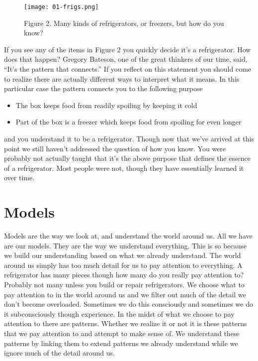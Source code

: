\documentclass[]{memoir}
\let\Oldincludegraphics\includegraphics
\renewcommand{\includegraphics}[1]{\Oldincludegraphics[max size={\textwidth}{\textheight}]{#1}}
\begin{document}
\begin{figure}[htbp]
\centering
\texttt{[image: 01-frigs.png]}
\caption{Figure 2. Many kinds of refrigerators, or freezers, but how do
you know?}
\end{figure}

If you see any of the items in Figure 2 you quickly decide it's a
refrigerator. How does that happen? Gregory Bateson, one of the great
thinkers of our time, said, ``It's the pattern that connects.'' If you
reflect on this statement you should come to realize there are actually
different ways to interpret what it means. In this particular case the
pattern connects you to the following purpose

\begin{itemize}
\itemsep1pt\parskip0pt
\item
  The box keeps food from readily spoiling by keeping it cold
\item
  Part of the box is a freezer which keeps food from spoiling for even
  longer
\end{itemize}

and you understand it to be a refrigerator. Though now that we've
arrived at this point we still haven't addressed the question of how you
know. You were probably not actually taught that it's the above purpose
that defines the essence of a refrigerator. Most people were not, though
they have essentially learned it over time.

\section{Models}

Models are the way we look at, and understand the world around us. All
we have are our models. They are the way we understand everything. This
is so because we build our understanding based on what we already
understand. The world around us simply has too much detail for us to pay
attention to everything. A refrigerator has many pieces though how many
do you really pay attention to? Probably not many unless you build or
repair refrigerators. We choose what to pay attention to in the world
around us and we filter out much of the detail we don't become
overloaded. Sometimes we do this consciously and sometimes we do it
subconsciously though experience. In the midst of what we choose to pay
attention to there are patterns. Whether we realize it or not it is
these patterns that we pay attention to and attempt to make sense of. We
understand these patterns by linking them to extend patterns we already
understand while we ignore much of the detail around us.
\end{document}
